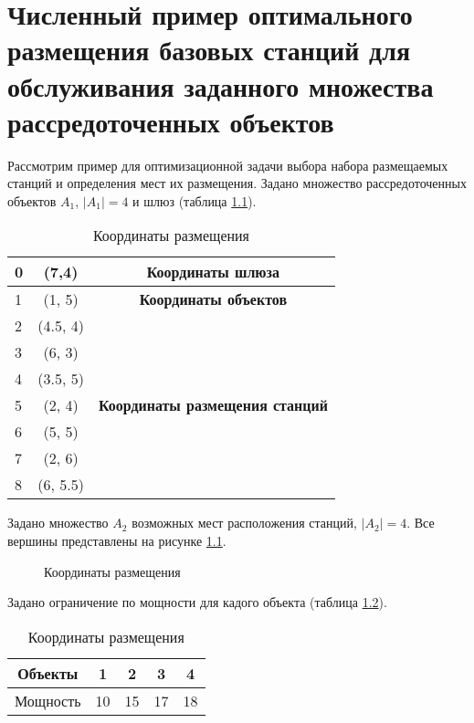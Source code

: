 \chapter{Численный пример оптимального размещения базовых станций для обслуживания заданного множества рассредоточенных объектов}\label{app:milp_place_solution}
Рассмотрим пример для оптимизационной задачи выбора набора размещаемых станций и определения мест их размещения.
Задано множество рассредоточенных объектов $A_1$, $|A_1| = 4$ и шлюз (таблица \cref{tab:part2_placement_coordinates}).

\begin{table}
    \centering
    \captionsetup{justification=centering} %
    \caption{Координаты размещения}\label{tab:part2_placement_coordinates}
    \begin{tabular}{|l|c|c|}
        \toprule
        0   & (7,4) & \textbf{Координаты шлюза} \\
        \midrule
        1   & (1, 5)& \textbf{Координаты объектов}  \\
        2   & (4.5, 4) & \\
        3   & (6, 3) & \\
        4   & (3.5, 5) & \\
        \midrule
        5   & (2, 4) & \textbf{Координаты размещения станций}  \\
        6   & (5, 5) & \\
        7   & (2, 6) & \\
        8   & (6, 5.5) & \\
        \bottomrule
    \end{tabular}
\end{table}

Задано множество $A_2$ возможных мест расположения станций, $|A_2| = 4$. Все вершины представлены на рисунке \ref{fig:part2_coordinates}.
 
\begin{figure}[ht]
    \caption{Координаты размещения}\label{fig:part2_coordinates}
\end{figure}

Задано ограничение по мощности для кадого объекта (таблица \ref{tab:part2_object_capacity}).

\begin{table}
    \centering
    \captionsetup{justification=centering} %
    \caption{Координаты размещения}\label{tab:part2_object_capacity}
    \begin{tabular}{|c|cccc|}
        \toprule
        Объекты   & 1 & 2 & 3 & 4 \\
        \midrule
        Мощность  & 10 & 15 & 17 & 18 \\
        \bottomrule
    \end{tabular}
\end{table}

